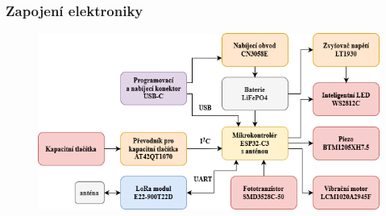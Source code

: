 \documentclass[%
  12pt,       				%
	t,                  %
	aspectratio=1610,   %
	unicode,						%
]{beamer}				    	%
\begin{document}
\begin{frame} 
	\frametitle{Zapojení elektroniky}
	\begin{figure}%
		\centering	          
		\includegraphics[width=1\columnwidth]{obrazky/blokove_schema_finalni_verze.png}
	\end{figure}
\end{frame}
\end{document}
